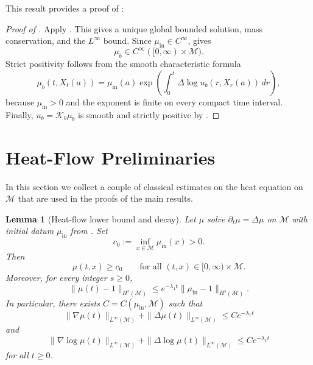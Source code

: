\documentclass[11pt]{article}
\newtheorem{lemma}[theorem]{Lemma}
\theoremstyle{definition}
\def\M{\mathcal M}
\begin{document}
This result provides a proof of :
\begin{proof}[Proof of ]
Apply .  This gives a unique global bounded solution, mass
conservation, and the \(L^\infty\) bound.  Since \(\mu_{\mathrm{in}}\in C^\infty\),
 gives
\[
\mu_b\in C^\infty([0,\infty)\times \M).
\]
Strict positivity follows from the smooth characteristic formula
\[
\mu_b(t,X_t(a))
=
\mu_{\mathrm{in}}(a)
\exp\left(\int_0^t\Delta\log u_b(r,X_r(a))\,dr\right),
\]
because \(\mu_{\mathrm{in}}>0\) and the exponent is finite on every compact time
interval.  Finally, \(u_b=\mathcal K_b\mu_b\) is smooth and strictly positive by
.
\end{proof}

\section{Heat-Flow Preliminaries}\label{app:heat_preliminaries}
In this section we collect a couple of classical estimates on the heat equation on
 $\M$ that are used in the proofs of the main results.

\begin{lemma}[Heat-flow lower bound and decay]\label{lem:heat_flow_bounds}
Let $\mu$ solve $\partial_t \mu = \Delta \mu$ on  $\M$ with initial datum $\mu_{\mathrm{in}}$ from . Set
\[
c_0 := \inf_{x\in  \M}\mu_{\mathrm{in}}(x) > 0.
\]
Then
\[
\mu(t,x)\ge c_0
\qquad
\text{for all }(t,x)\in [0,\infty)\times  \M.
\]
Moreover, for every integer $s\ge0$,
\[
\|\mu(t)-1\|_{H^s( \M)}
\le
e^{- \lambda_1t}\|\mu_{\mathrm{in}}-1\|_{H^s( \M)}.
\]
In particular, there exists $C=C(\mu_{\mathrm{in}}, \M)$ such that
\[
\|\nabla \mu(t)\|_{L^\infty( \M)} + \|\Delta \mu(t)\|_{L^\infty( \M)}
\le
Ce^{- \lambda_1t}
\]
and
\[
\|\nabla \log \mu(t)\|_{L^\infty( \M)}
+
\|\Delta \log \mu(t)\|_{L^\infty( \M)}
\le
Ce^{- \lambda_1t}
\]
for all $t\ge0$.
\end{lemma}
\end{document}
